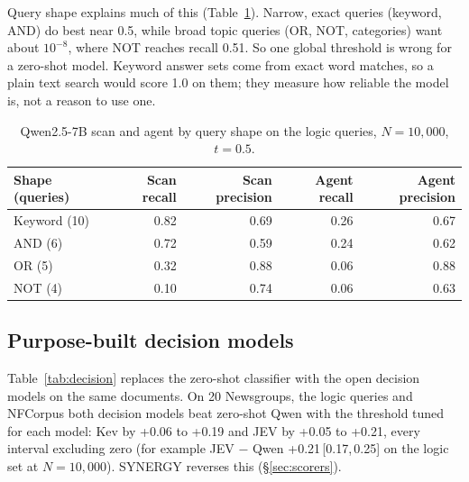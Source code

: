 \documentclass[11pt]{article}
\newcommand{\ci}[2]{\,[#1,\,#2]}
\begin{document}
Query shape explains much of this (Table~\ref{tab:shape}). Narrow, exact
queries (keyword, AND) do best near 0.5, while broad topic queries (OR, NOT,
categories) want about $10^{-8}$, where NOT reaches recall 0.51. So one global
threshold is wrong for a zero-shot model. Keyword answer sets come from exact
word matches, so a plain text search would score 1.0 on them; they measure how
reliable the model is, not a reason to use one.

\begin{table}[t]
\centering
\small
\begin{tabular}{@{}lrrrr@{}}
\toprule
Shape (queries) & Scan recall & Scan precision & Agent recall & Agent precision \\
\midrule
Keyword (10) & 0.82 & 0.69 & 0.26 & 0.67 \\
AND (6) & 0.72 & 0.59 & 0.24 & 0.62 \\
OR (5) & 0.32 & 0.88 & 0.06 & 0.88 \\
NOT (4) & 0.10 & 0.74 & 0.06 & 0.63 \\
\bottomrule
\end{tabular}
\caption{Qwen2.5-7B scan and agent by query shape on the logic queries,
$N=10{,}000$, $t=0.5$.}
\label{tab:shape}
\end{table}

\subsection{Purpose-built decision models}
\label{sec:decision}

Table~\ref{tab:decision} replaces the zero-shot classifier with the open
decision models on the same documents. On 20 Newsgroups, the logic queries and
NFCorpus both decision models beat zero-shot Qwen with the threshold tuned for
each model: Kev by +0.06 to +0.19 and JEV by +0.05 to +0.21, every interval
excluding zero (for example JEV $-$ Qwen +0.21\ci{0.17}{0.25} on the logic set
at $N=10{,}000$). SYNERGY reverses this (\S\ref{sec:scorers}).
\end{document}
